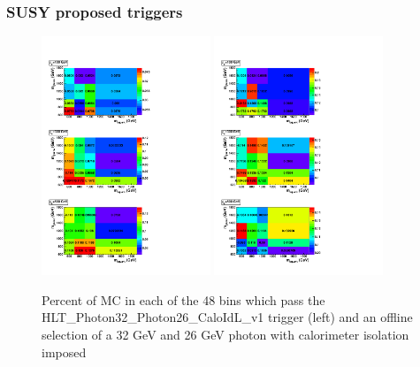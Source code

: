 \subsubsection{SUSY proposed triggers}

 \begin{figure}[!ht]
  \centering
 \includegraphics[width=0.45\textwidth]{figures/trigPhoton3226.pdf}
 \includegraphics[width=0.45\textwidth]{figures/Photon3226.pdf}

\caption{Percent of MC in each of the 48 bins which pass the HLT\_Photon32\_Photon26\_CaloIdL\_v1 trigger 
(left) and an offline selection of a 32 GeV and 26 GeV photon with calorimeter isolation imposed}
\label{fig:diphotrigs}
\end{figure}

